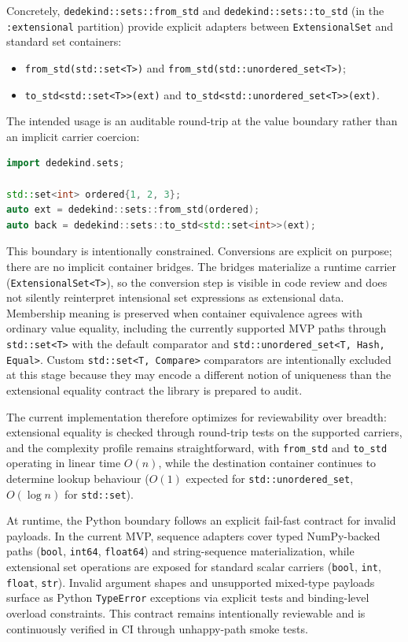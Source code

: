 \documentclass[11pt, a4paper]{report}
\begin{document}
Concretely, \texttt{dedekind::sets::from\_std} and \texttt{dedekind::sets::to\_std} (in the \texttt{:extensional} partition) provide explicit adapters between \texttt{ExtensionalSet} and standard set containers:
\begin{itemize}
  \item \texttt{from\_std(std::set<T>)} and \texttt{from\_std(std::unordered\_set<T>)};
  \item \texttt{to\_std<std::set<T>>(ext)} and \texttt{to\_std<std::unordered\_set<T>>(ext)}.
\end{itemize}

The intended usage is an auditable round-trip at the value boundary rather than an implicit carrier coercion:
\begin{lstlisting}[language=C++, caption={Explicit std-container round-trip through the wrapper-facing facade.}, label={lst:python_interop_roundtrip}]
import dedekind.sets;

std::set<int> ordered{1, 2, 3};
auto ext = dedekind::sets::from_std(ordered);
auto back = dedekind::sets::to_std<std::set<int>>(ext);
\end{lstlisting}

This boundary is intentionally constrained. Conversions are explicit on purpose; there are no implicit container bridges. The bridges materialize a runtime carrier (\texttt{ExtensionalSet<T>}), so the conversion step is visible in code review and does not silently reinterpret intensional set expressions as extensional data. Membership meaning is preserved when container equivalence agrees with ordinary value equality, including the currently supported MVP paths through \texttt{std::set<T>} with the default comparator and \texttt{std::unordered\_set<T, Hash, Equal>}. Custom \texttt{std::set<T, Compare>} comparators are intentionally excluded at this stage because they may encode a different notion of uniqueness than the extensional equality contract the library is prepared to audit.

The current implementation therefore optimizes for reviewability over breadth: extensional equality is checked through round-trip tests on the supported carriers, and the complexity profile remains straightforward, with \texttt{from\_std} and \texttt{to\_std} operating in linear time $O(n)$, while the destination container continues to determine lookup behaviour ($O(1)$ expected for \texttt{std::unordered\_set}, $O(\log n)$ for \texttt{std::set}).

At runtime, the Python boundary follows an explicit fail-fast contract for invalid payloads. In the current MVP, sequence adapters cover typed NumPy-backed paths (\texttt{bool}, \texttt{int64}, \texttt{float64}) and string-sequence materialization, while extensional set operations are exposed for standard scalar carriers (\texttt{bool}, \texttt{int}, \texttt{float}, \texttt{str}). Invalid argument shapes and unsupported mixed-type payloads surface as Python \texttt{TypeError} exceptions via explicit tests and binding-level overload constraints. This contract remains intentionally reviewable and is continuously verified in CI through unhappy-path smoke tests.
\end{document}
